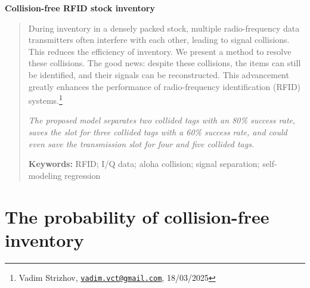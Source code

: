 \documentclass[12pt]{article}
\begin{document}
\begin{center}
{\Huge\bf Collision-free RFID stock inventory}%
\end{center}

\begin{quote}
During inventory in a densely packed stock, multiple radio-frequency data transmitters often interfere with each other, leading to signal collisions. This reduces the efficiency of inventory. We present a method to resolve these collisions. The good news: despite these collisions, the items can still be identified, and their signals can be reconstructed. This advancement greatly enhances the performance of radio-frequency identification (RFID) systems.\footnote{Vadim Strizhov, \href{mailto:vadim.vct@gmail.com}{\texttt{vadim.vct@gmail.com}}, 18/03/2025}

\emph{The proposed model separates two collided tags with an 80\% success rate, saves the slot for three collided tags with a 60\% success rate, and could even save the transmission slot for four and five collided tags.}

\bigskip
\noindent \textbf{Keywords:} RFID; I/Q data;  aloha collision; signal separation; self-modeling regression
\bigskip
\end{quote}

\section{The probability of collision-free inventory}
\end{document}
